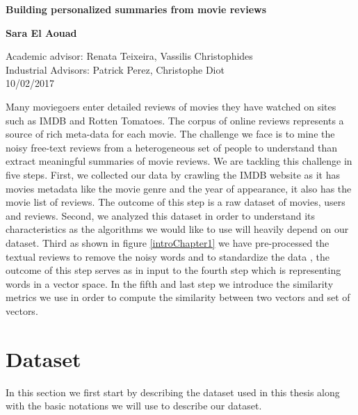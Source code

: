 \documentclass{article}
\begin{document}
\begin{titlepage}
    \begin{center}
        \vspace*{1cm}
        
        \textbf{Building personalized summaries from movie reviews}
        
        \vspace{0.5cm}
       
        \vspace{1.5cm}
        
        \textbf{Sara El Aouad}
        
        \vfill
        
       
        \vspace{0.8cm}
       
        Academic advisor: Renata Teixeira, Vassilis Christophides\\
        Industrial Advisors: Patrick Perez, Christophe Diot\\
        
        10/02/2017
        
    \end{center}
\end{titlepage}
\newpage

Many moviegoers enter detailed reviews of movies they have watched on sites such as IMDB and Rotten Tomatoes. The corpus of online reviews represents a source of rich meta-data for each movie.
The challenge we face is to mine the noisy free-text reviews from a heterogeneous set of people to understand than extract meaningful summaries of movie reviews. We are tackling this challenge in five steps. First, we collected our data by crawling the IMDB website as it has movies metadata like the movie genre and the year of appearance, it also has the movie list of reviews. The outcome of this step is a raw dataset of movies, users and reviews. Second, we analyzed this dataset in order to understand its characteristics as the algorithms we would like to use will heavily depend on our dataset. Third as shown in figure \ref{introChapter1} we have pre-processed the textual reviews to remove the noisy words and to standardize the data , the outcome of this step serves as in input to the fourth step which is representing words in a vector space. In the fifth and last step we introduce the similarity metrics we use in order to compute the similarity between two vectors and set of vectors.
\section{Dataset}
\label{section:dataset}
In this section we first start by describing the dataset used in this thesis along with the basic notations we will use to describe our dataset. 
\end{document}
